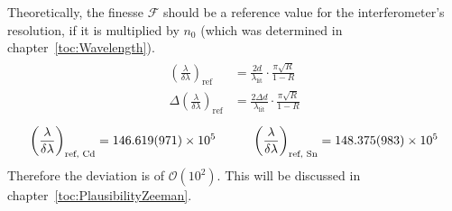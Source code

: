 Theoretically, the finesse $\mathcal{F}$ should be a reference value for the interferometer's resolution, if it is multiplied by $n_0$ (which was determined in chapter~\ref{toc:Wavelength}).
	\begin{align}
	\begin{split}
	\left(\frac{\lambda}{\delta\lambda}\right)_{\text{ref}} 	&= \frac{2 d}{\lambda_\text{lit}} \cdot \frac{\pi \sqrt{R}}{1-R}\\
	\Delta \left(\frac{\lambda}{\delta\lambda}\right)_{\text{ref}}	&= \frac{2 \Delta d}{\lambda_\text{lit}} \cdot \frac{\pi \sqrt{R}}{1-R}
	\end{split}
	\end{align}
	\begin{align}
	\left(\frac{\lambda}{\delta\lambda}\right)_{\text{ref, Cd}} = \num{146.619 \pm 0.971 e5} \hspace{1.0cm} \left(\frac{\lambda}{\delta\lambda}\right)_{\text{ref, Sn}} = \num{148.375 \pm 0.983 e5}
	\end{align}
Therefore the deviation is of $\mathcal{O}(10^2)$.
This will be discussed in chapter~\ref{toc:PlausibilityZeeman}.
